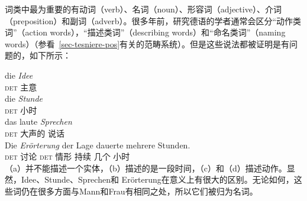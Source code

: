 词类中最为重要的有动词（verb）、名词（noun）、形容词（adjective）、介词（preposition）和副词（adverb）。很多年前，研究德语的学者通常会区分“动作类词”（action words），“描述类词”（describing words）和“命名类词”（naming words）（参看~\ref{sec-tesniere-pos}有关\tes 的范畴系统）。但是这些说法都被证明是有问题的，如下所示：

\eal
\ex 
\gll die \emph{Idee}\\
	\textsc{det} 主意\\
\ex 
\gll die \emph{Stunde}\\
	 \textsc{det} 小时\\
\ex 
\gll das laute \emph{Sprechen}\\
     \textsc{det} 大声的 说话\\
\ex 
\gll Die \emph{Erörterung} der Lage dauerte mehrere Stunden.\\
     \textsc{det} 讨论 \textsc{det} 情形 持续 几个 小时\\
\zl
（a）并不能描述一个实体，（b）描述的是一段时间，（c）和（d）描述动作。显然，Idee、Stunde、Sprechen和 Erörterung在意义上有很大的区别。无论如何，这些词仍在很多方面与Mann和Frau有相同之处，所以它们被归为名词。

